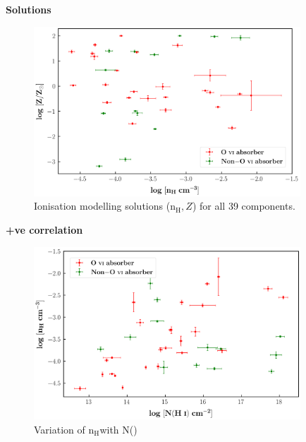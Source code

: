 \begin{frame}[noframenumbering]{\textbf{Solutions}}

\begin{figure}[!htbp]
    \centering
    \vspace*{-2mm}
    \includegraphics[width=10cm]{Figures-Thesis/Z_vs_nH.png}
    \vspace*{-1mm}
    \caption{Ionisation modelling solutions ($\text{n}_\text{H}, Z$) for all 39 components.}
\end{figure} 


\end{frame}


\begin{frame}[noframenumbering]{\textbf{+ve correlation}}

\begin{figure}[!htbp]
    \centering
    \vspace*{-2mm}
    \includegraphics[width=10cm]{Figures-Thesis/nH_vs_NHi.png}
    \vspace*{-1mm}
    \caption{Variation of $\text{n}_\text{H}$with N()}
\end{figure}  

\end{frame}


